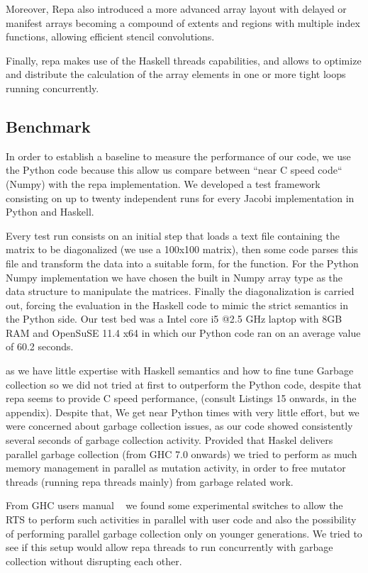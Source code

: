 \documentclass{tmr}
\begin{document}
Moreover, Repa also introduced a more advanced array layout with delayed or manifest 
arrays becoming a compound of extents and regions with multiple index functions, 
allowing efficient stencil convolutions.

Finally, repa makes use of the Haskell threads capabilities, and allows to optimize and
distribute the calculation of the array elements in one or more tight loops running concurrently.


\subsection{Benchmark}

In order to establish a baseline to measure the performance of our code, 
we use the Python code because this allow us compare between ``near C speed code``
(Numpy) with the repa implementation. We developed a test framework consisting 
on up to twenty independent runs for every Jacobi implementation in Python and Haskell.

Every test run consists on an initial step that loads a text file containing
the matrix to be diagonalized (we use a 100x100 matrix), then some code parses
this file and transform the data into a suitable form, for the  function. 
For the Python Numpy implementation we have chosen the built in Numpy array type
as the data structure to manipulate the matrices. Finally the diagonalization is
carried out, forcing the evaluation in the Haskell code to mimic the strict 
semantics in the Python side. Our test bed was a Intel core i5 @2.5 GHz 
laptop with 8GB RAM and OpenSuSE 11.4 x64 in which our Python code 
ran on an average value of 60.2 seconds. 

as we have little expertise with Haskell semantics and 
how to fine tune Garbage collection so we did not tried at first to outperform the Python
code, despite that repa seems to provide C speed performance, (consult Listings 15 onwards, in the appendix).
Despite that, We get near Python times with very little effort, but we were concerned about garbage collection 
issues, as our code showed consistently several seconds of garbage collection activity. Provided that Haskel
delivers parallel garbage collection (from GHC 7.0 onwards) we tried to perform as much memory management in parallel
as mutation activity, in order to free mutator threads (running repa threads mainly) from garbage related work.

From GHC users manual ~\cite{ghc} we found some experimental switches to allow the RTS to perform such activities in parallel
with user code and also the possibility of performing parallel garbage collection only on younger generations.
We tried to see if this setup would allow repa threads to run concurrently with garbage collection without  
disrupting each other.
\end{document}
